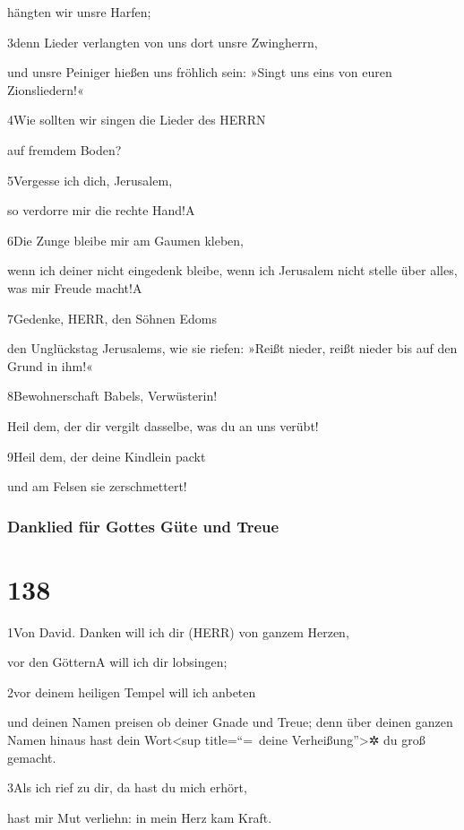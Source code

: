 hängten wir unsre Harfen;

3denn Lieder verlangten von uns dort unsre Zwingherrn,

und unsre Peiniger hießen uns fröhlich sein: »Singt uns eins von euren
Zionsliedern!«

4Wie sollten wir singen die Lieder des HERRN

auf fremdem Boden?

5Vergesse ich dich, Jerusalem,

so verdorre mir die rechte Hand!{A}

6Die Zunge bleibe mir am Gaumen kleben,

wenn ich deiner nicht eingedenk bleibe, wenn ich Jerusalem nicht stelle
über alles, was mir Freude macht!{A}

7Gedenke, HERR, den Söhnen Edoms

den Unglückstag Jerusalems, wie sie riefen: »Reißt nieder, reißt nieder
bis auf den Grund in ihm!«

8Bewohnerschaft Babels, Verwüsterin!

Heil dem, der dir vergilt dasselbe, was du an uns verübt!

9Heil dem, der deine Kindlein packt

und am Felsen sie zerschmettert!

\hypertarget{danklied-fuxfcr-gottes-guxfcte-und-treue}{%
\subsubsection{Danklied für Gottes Güte und
Treue}\label{danklied-fuxfcr-gottes-guxfcte-und-treue}}

\hypertarget{section-137}{%
\section{138}\label{section-137}}

1Von David. Danken will ich dir (HERR) von ganzem Herzen,

vor den Göttern{A} will ich dir lobsingen;

2vor deinem heiligen Tempel will ich anbeten

und deinen Namen preisen ob deiner Gnade und Treue; denn über deinen
ganzen Namen hinaus hast dein Wort\textless sup title=``=~deine
Verheißung''\textgreater✲ du groß gemacht.

3Als ich rief zu dir, da hast du mich erhört,

hast mir Mut verliehn: in mein Herz kam Kraft.

